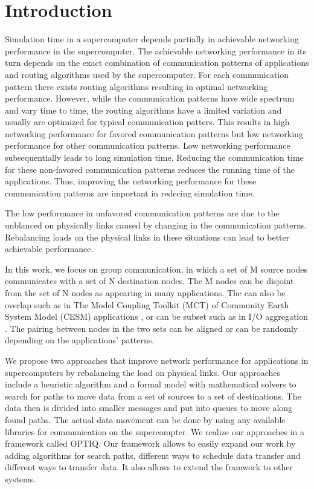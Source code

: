 \section{Introduction}
\label{sec:intro}
Simulation time in a supercomputer depends partially in achievable networking performance in the supercomputer. The achievable networking performance in its turn depends on the exact combination of communication patterns of applications and routing algorithms used by the supercomputer. For each communication pattern there exists routing algorithms resulting in optimal networking performance. However, while the communication patterns have wide spectrum and vary time to time, the routing algorithms have a limited variation and usually are optimized for typical communication patters. This results in high networking performance for favored communication patterns but low networking performance for other communication patterns. Low networking performance subsequentially leads to long simulation time. Reducing the communication time for these non-favored communication patterns reduces the running time of the applications. Thus, improving the networking performance for these communication patterns are important in redecing simulation time. 

The low performance in unfavored communication patterns are due to the unblanced on physically links caused by changing in the communication patterns. Rebalancing loads on the physical links in these situations can lead to better achievable performance. 

In this work, we focus on group communication, in which a set of M source nodes communicates with a set of N destination nodes. The M nodes can be disjoint from the set of N nodes as appearing in many applications. The can also be overlap such as in The Model Coupling Toolkit (MCT) of Community Earth System Model (CESM) applications \cite{MCT:Jacob}, or can be subset such as in I/O aggregation \cite{Vishwanath:GLEAN}. The pairing between nodes in the two sets can be aligned or can be randomly depending on the applications' patterns.

We propose two approaches that improve network performance for applications in supercomputers by rebalancing the load on physical links. Our approaches include a heuristic algorithm and a formal model with mathematical solvers to search for paths to move data from a set of sources to a set of destinations. The data then is divided into smaller messages and put into queues to move along found paths. The actual data movement can be done by using any available libraries for communication on the supercompter. We realize our approaches in a framework called OPTIQ. Our framework allows to easily expand our work by adding algorithms for search paths, different ways to schedule data transfer and different ways to transfer data. It also allows to extend the framwork to other systems.

